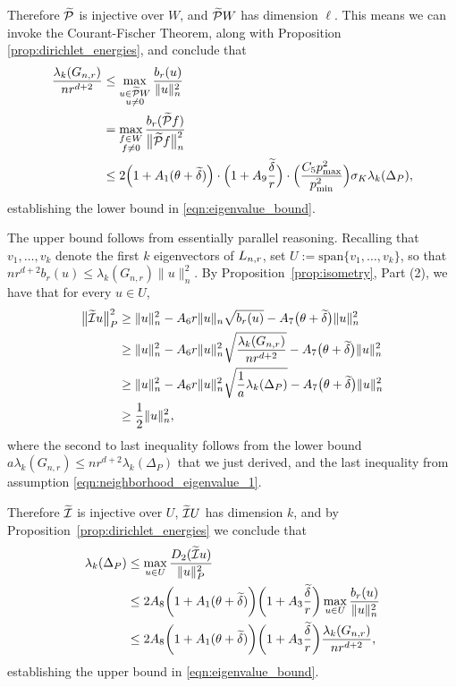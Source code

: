 Therefore $\widetilde{\mathcal{P}}$ is injective over $W$, and $\widetilde{\mathcal{P}}W$ has dimension $\ell$. This means we can invoke the Courant-Fischer Theorem, along with Proposition \ref{prop:dirichlet_energies}, and conclude that
\begin{align*}
\frac{\lambda_k(G_{n,r})}{nr^{d + 2}} & \leq \max_{\substack{u \in \widetilde{\mathcal{P}}W \\ u \neq 0} } \frac{b_r(u)}{\|u\|_{n}^2} \\
& = \max_{\substack{f \in W \\ f \neq 0} } \frac{b_r(\widetilde{\mathcal{P}}f)}{\bigl\|\widetilde{\mathcal{P}}f\bigr\|_{n}^2} \\
& \leq 2\Bigl(1 + A_1(\theta + \widetilde{\delta})\Bigr) \cdot \Bigl(1 + A_9\frac{\widetilde{\delta}}{r}\Bigr) \cdot \Bigl(\frac{C_5 p_{\max}^2}{p_{\min}^2}\Bigr) \sigma_K \lambda_{k}(\Delta_P),
\end{align*}
establishing the lower bound in \eqref{eqn:eigenvalue_bound}.

The upper bound follows from essentially parallel reasoning. Recalling that $v_1,\ldots,v_k$ denote the first $k$ eigenvectors of $L_{n,r}$, set $U := \mathrm{span}\{v_1,\ldots,v_k\}$, so that $nr^{d + 2} b_r(u) \leq \lambda_k(G_{n,r}) \|u\|_n^2$. By Proposition~\ref{prop:isometry}, Part (2), we have that for every $u \in U$,
\begin{align*}
\bigl\|\widetilde{\mathcal{I}}u\bigr\|_{P}^2 & \geq \|u\|_n^2 - A_6 r \|u\|_n \sqrt{b_r(u)} - A_7\bigl(\theta + \widetilde{\delta}\bigr)\|u\|_n^2 \\
& \geq \|u\|_n^2 - A_6 r \|u\|_n^2 \sqrt{\frac{\lambda_{k}(G_{n,r})}{nr^{d + 2}}} - A_7\bigl(\theta + \widetilde{\delta}\bigr)\|u\|_n^2 \\
& \geq \|u\|_n^2 - A_6 r \|u\|_n^2 \sqrt{\frac{1}{a}\lambda_k(\Delta_P)} - A_7\bigl(\theta + \widetilde{\delta}\bigr)\|u\|_n^2 \\
& \geq \frac{1}{2}\|u\|_n^2,
\end{align*}
where the second to last inequality follows from the lower bound $a \lambda_k(G_{n,r}) \leq nr^{d + 2}\lambda_k(\Delta_P)$ that we just derived, and the last inequality from assumption \eqref{eqn:neighborhood_eigenvalue_1}.

Therefore $\widetilde{\mathcal{I}}$ is injective over $U$, $\widetilde{\mathcal{I}}U$ has dimension $k$, and by Proposition~\ref{prop:dirichlet_energies} we conclude that
\begin{align*}
\lambda_k(\Delta_P) & \leq \max_{u \in U} \frac{D_2(\widetilde{\mathcal{I}}u)}{\|u\|_P^2} \\
& \leq 2A_8\biggl(1 + A_1(\theta + \widetilde{\delta})\biggr) \biggl(1 + A_3 \frac{\widetilde{\delta}}{r}\biggr)\max_{u \in U} \frac{b_r(u)}{\|u\|_n^2} \\
& \leq 2A_8\biggl(1 + A_1(\theta + \widetilde{\delta})\biggr) \biggl(1 + A_3\frac{\widetilde{\delta}}{r}\biggr) \frac{\lambda_k(G_{n,r})}{nr^{d + 2}},
\end{align*}
establishing the upper bound in \eqref{eqn:eigenvalue_bound}.

